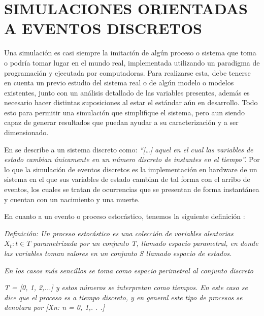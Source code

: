 
\section{SIMULACIONES ORIENTADAS A EVENTOS DISCRETOS}


Una simulación es casi siempre la imitación de algún proceso o sistema que toma o podría tomar lugar en el mundo real, implementada utilizando un paradigma de programación y ejecutada por computadoras. Para realizarse esta, debe tenerse en cuenta un previo estudio del sistema real o de algún modelo o modelos existentes, junto con un análisis detallado de las variables presentes, además es necesario hacer distintas suposiciones al estar el estándar aún en desarrollo. Todo esto para permitir una simulación que simplifique el sistema, pero aun siendo capaz de generar resultados que puedan ayudar a su caracterización y a ser dimensionado. \newline

En \parencite{Banks2005} se describe a un sistema discreto como: \textit{``[{\dots}] aquel en el cual las variables de estado cambian únicamente en un número discreto de instantes en el tiempo''.} Por lo que la simulación de eventos discretos es la implementación en hardware de un sistema en el que sus variables de estado cambian de tal forma con el arribo de eventos, los cuales se tratan de ocurrencias que se presentan de forma instantánea y cuentan con un nacimiento y una muerte.\newline

En cuanto a un evento o proceso estocástico, tenemos la siguiente definición \parencite{Correia2018}:\newline

\textit{Definición: Un proceso estocástico es una colección de variables aleatorias $X_{t}:t\in T$ parametrizada por un conjunto T, llamado espacio parametral, en donde las variables toman valores en un conjunto S llamado espacio de estados.}\newline

\textit{En los casos más sencillos se toma como espacio perimetral al conjunto discreto}\newline

\textit{T = [0, 1, 2,...] y estos números se interpretan como tiempos. En este caso se dice que el proceso es a tiempo discreto, y en general este tipo de procesos se denotara  por [Xn: n = 0, 1,. . .]} 

